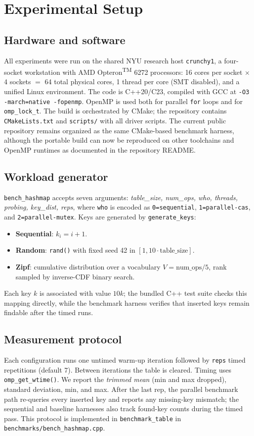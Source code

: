 \documentclass[10pt,twocolumn]{article}
\begin{document}
\section{Experimental Setup}

\subsection{Hardware and software}
All experiments were run on the shared NYU research host
\texttt{crunchy1}, a four-socket workstation with AMD
Opteron\textsuperscript{TM} 6272 processors: 16 cores per socket
$\times$ 4 sockets $=$ 64 total physical cores, 1 thread per core
(SMT disabled), and a unified Linux environment. The code is
C++20/C23, compiled with GCC at \texttt{-O3 -march=native
-fopenmp}. OpenMP is used both for parallel \texttt{for} loops and
for \texttt{omp\_lock\_t}. The build is orchestrated by CMake; the
repository contains \texttt{CMakeLists.txt} and \texttt{scripts/}
with all driver scripts. The current public repository remains
organized as the same CMake-based benchmark harness, although the
portable build can now be reproduced on other toolchains and OpenMP
runtimes as documented in the repository README.

\subsection{Workload generator}
\texttt{bench\_hashmap} accepts seven arguments: \emph{table\_size,
num\_ops, who, threads, probing, key\_dist, reps}, where
\texttt{who} is encoded as \texttt{0=sequential},
\texttt{1=parallel-cas}, and \texttt{2=parallel-mutex}.
Keys are generated by \texttt{generate\_keys}:
\begin{itemize}
\item \textbf{Sequential}: $k_i = i+1$.
\item \textbf{Random}: \texttt{rand()} with fixed seed 42 in
$[1, 10\cdot\text{table\_size}]$.
\item \textbf{Zipf}: cumulative distribution over a vocabulary
$V = \text{num\_ops}/5$, rank sampled by inverse-CDF binary search.
\end{itemize}
Each key $k$ is associated with value $10k$; the bundled C++ test
suite checks this mapping directly, while the benchmark harness
verifies that inserted keys remain findable after the timed runs.

\subsection{Measurement protocol}
Each configuration runs one untimed warm-up iteration followed by
\texttt{reps} timed repetitions (default 7). Between iterations the
table is cleared. Timing uses \texttt{omp\_get\_wtime()}. We report
the \emph{trimmed mean} (min and max dropped), standard deviation,
min, and max. After the last rep, the parallel benchmark path
re-queries every inserted key and reports any missing-key mismatch;
the sequential and baseline harnesses also track found-key counts
during the timed pass. This protocol is implemented in
\texttt{benchmark\_table} in \texttt{benchmarks/bench\_hashmap.cpp}.
\end{document}
